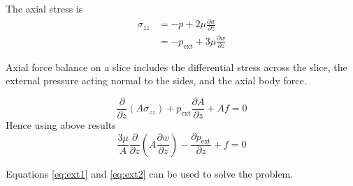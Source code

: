 \documentclass{jknotes}
\begin{document}
The axial stress is 
\begin{align}
	\sigma_{zz} &= -p + 2\mu \frac{\partial w}{\partial z} \\
			&= -p_{\text{ext}} + 3\mu \frac{\partial w}{\partial z}
\end{align}

Axial force balance on a slice includes the differential stress across the
slice, the external pressure acting normal to the sides, and the axial body
force.
\begin{center}
\end{center}

\begin{equation}
	\frac{\partial}{\partial z}(A\sigma_{zz}) + p_{\text{ext}} \frac{\partial
	A}{\partial z} + A f = 0
\end{equation}
Hence using above results
\begin{equation}
	\frac{3\mu}{A} \frac{\partial}{\partial z} (A\frac{\partial w}{\partial
		z}) - \frac{\partial p_{\text{ext}}}{\partial z} + f =
		0\label{eq:ext1}
\end{equation}

Equations \eqref{eq:ext1} and \eqref{eq:ext2} can be used to solve the problem. 
\end{document}
